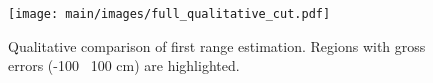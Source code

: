 \begin{figure}[t]
\centering
\texttt{[image: main/images/full\_qualitative\_cut.pdf]}
\caption{Qualitative comparison of first range estimation. Regions with gross errors (-100 \bwr~100 cm) are highlighted.}
\label{fig:full_qualitative}
\end{figure}